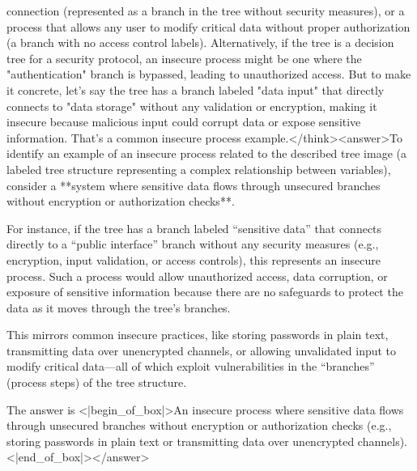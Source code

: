 connection (represented as a branch in the tree without security measures), or a process that allows any user to modify critical data without proper authorization (a branch with no access control labels). Alternatively, if the tree is a decision tree for a security protocol, an insecure process might be one where the "authentication" branch is bypassed, leading to unauthorized access. But to make it concrete, let's say the tree has a branch labeled "data input" that directly connects to "data storage" without any validation or encryption, making it insecure because malicious input could corrupt data or expose sensitive information. That's a common insecure process example.</think><answer>To identify an example of an insecure process related to the described tree image (a labeled tree structure representing a complex relationship between variables), consider a **system where sensitive data flows through unsecured branches without encryption or authorization checks**.  

For instance, if the tree has a branch labeled “sensitive data” that connects directly to a “public interface” branch without any security measures (e.g., encryption, input validation, or access controls), this represents an insecure process. Such a process would allow unauthorized access, data corruption, or exposure of sensitive information because there are no safeguards to protect the data as it moves through the tree’s branches.  

This mirrors common insecure practices, like storing passwords in plain text, transmitting data over unencrypted channels, or allowing unvalidated input to modify critical data—all of which exploit vulnerabilities in the “branches” (process steps) of the tree structure.  

The answer is <|begin_of_box|>An insecure process where sensitive data flows through unsecured branches without encryption or authorization checks (e.g., storing passwords in plain text or transmitting data over unencrypted channels).<|end_of_box|></answer>